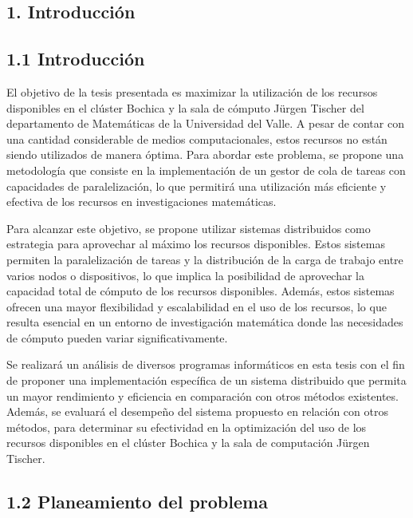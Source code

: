\begin{doublespace}
\begin{tightcenter}
\section{1. Introducción}
\mylinespacing
\end{tightcenter}

\begin{multicols}{2}

    \subsection{1.1  Introducción}

    El objetivo de la tesis presentada es maximizar la utilización de los recursos disponibles en el clúster Bochica y la sala de cómputo Jürgen Tischer del departamento de Matemáticas de la Universidad del Valle. A pesar de contar con una cantidad considerable de medios computacionales, estos recursos no están siendo utilizados de manera óptima. Para abordar este problema, se propone una metodología que consiste en la implementación de un gestor de cola de tareas con capacidades de paralelización, lo que permitirá una utilización más eficiente y efectiva de los recursos en investigaciones matemáticas.

    Para alcanzar este objetivo, se propone utilizar sistemas distribuidos como estrategia para aprovechar al máximo los recursos disponibles. Estos sistemas permiten la paralelización de tareas y la distribución de la carga de trabajo entre varios nodos o dispositivos, lo que implica la posibilidad de aprovechar la capacidad total de cómputo de los recursos disponibles. Además, estos sistemas ofrecen una mayor flexibilidad y escalabilidad en el uso de los recursos, lo que resulta esencial en un entorno de investigación matemática donde las necesidades de cómputo pueden variar significativamente.

    Se realizará un análisis de diversos programas informáticos en esta tesis con el fin de proponer una implementación específica de un sistema distribuido que permita un mayor rendimiento y eficiencia en comparación con otros métodos existentes. Además, se evaluará el desempeño del sistema propuesto en relación con otros métodos, para determinar su efectividad en la optimización del uso de los recursos disponibles en el clúster Bochica y la sala de computación Jürgen Tischer.
    
    \subsection{1.2 Planeamiento del problema}


\end{multicols}
\end{doublespace}
